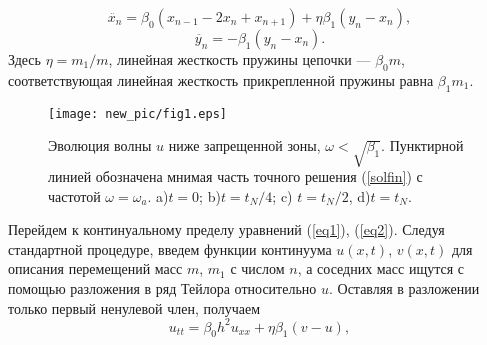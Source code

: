\begin{equation}
\ddot{x_n}=\beta_0 (x_{n-1}-2x_n+x_{n+1})+\eta \beta_1 (y_n-x_n), 
\label{eq1}
\end{equation}
\begin{equation}
\ddot{y_n}=-\beta_1 (y_n-x_n). \label{eq2}
\end{equation}
Здесь $ \eta = m_1 / m $, линейная жесткость пружины цепочки --- $ \beta_0 m $, соответствующая линейная жесткость прикрепленной пружины равна $ \beta_1 m_1 $. 
\begin{figure*}[h]
\begin{center}
\texttt{[image: new\_pic/fig1.eps]}
\end{center}
\caption{ Эволюция волны $ u $ ниже запрещенной зоны, $\omega<\sqrt{\beta_1}$. Пунктирной линией обозначена мнимая часть точного решения (\ref{solfin}) с частотой $\omega=\omega_a$.  a)$t=0$; b)$ t=t_N/4$; c) $t=t_N/2$, d)$t=t_N$.}
\label{fg1}
  \end{figure*}
Перейдем к континуальному пределу уравнений (\ref {eq1}), (\ref {eq2}). Следуя стандартной процедуре, введем функции континуума $ u(x, t) $, $ v(x, t) $ для описания перемещений масс $ m $, $ m_1 $ с числом $ n $, а  соседних масс ищутся с помощью разложения в ряд Тейлора относительно $ u $. Оставляя в разложении только первый ненулевой член, получаем
\begin{equation}
u_{tt}=\beta_0 h^2 u_{xx}+\eta \beta_1 (v-u), \label{eq3}
\end{equation}
